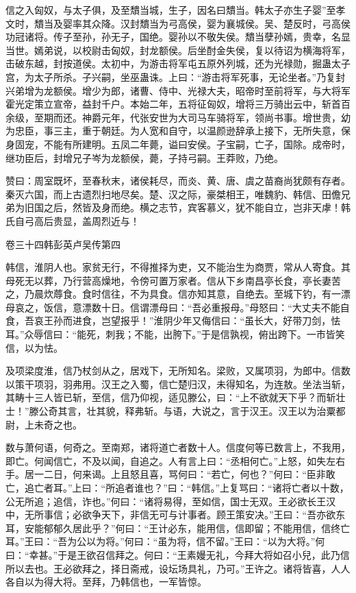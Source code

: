 \documentclass[12pt,UTF8]{ctexbook}
\begin{document}
信之入匈奴，与太子俱，及至穨当城，生子，因名曰穨当。韩太子亦生子婴”至孝文时，穨当及婴率其众降。汉封穨当为弓高侯，婴为襄城侯。吴、楚反时，弓高侯功冠诸将。传子至孙，孙无子，国绝。婴孙以不敬失侯。穨当孽孙嫣，贵幸，名显当世。嫣弟说，以校尉击匈奴，封龙额侯。后坐酎金失侯，复以待诏为横海将军，击破东越，封按道侯。太初中，为游击将军屯五原外列城，还为光禄勋，掘蛊太子宫，为太子所杀。子兴嗣，坐巫蛊诛。上曰：“游击将军死事，无论坐者。”乃复封兴弟增为龙额侯。增少为郎，诸曹、侍中、光禄大夫，昭帝时至前将军，与大将军霍光定策立宣帝，益封千户。本始二年，五将征匈奴，增将三万骑出云中，斩首百余级，至期而还。神爵元年，代张安世为大司马车骑将军，领尚书事。增世贵，幼为忠臣，事三主，重于朝廷。为人宽和自守，以温颜逊辞承上接下，无所失意，保身固宠，不能有所建明。五凤二年薨，谥曰安侯。子宝嗣，亡子，国除。成帝时，继功臣后，封增兄子岑为龙额侯，薨，子持弓嗣。王莽败，乃绝。



赞曰：周室既坏，至春秋末，诸侯耗尽，而炎、黄、唐、虞之苗裔尚犹颇有存者。秦灭六国，而上古遗烈扫地尽矣。楚、汉之际，豪桀相王，唯魏豹、韩信、田儋兄弟为旧国之后，然皆及身而绝。横之志节，宾客慕义，犹不能自立，岂非天虖！韩氏自弓高后贵显，盖周烈近与！





卷三十四韩彭英卢吴传第四



韩信，淮阴人也。家贫无行，不得推择为吏，又不能治生为商贾，常从人寄食。其母死无以葬，乃行营高燥地，令傍可置万家者。信从下乡南昌亭长食，亭长妻苦之，乃晨炊蓐食。食时信往，不为具食。信亦知其意，自绝去。至城下钓，有一漂母哀之，饭信，意漂数十日。信谓漂母曰：“吾必重报母。”母怒曰：“大丈夫不能自食，吾哀王孙而进食，岂望报乎！”淮阴少年又侮信曰：“虽长大，好带刀剑，怯耳。”众辱信曰：“能死，刺我；不能，出胯下。”于是信孰视，俯出跨下。一市皆笑信，以为怯。



及项梁度淮，信乃杖剑从之，居戏下，无所知名。梁败，又属项羽，为郎中。信数以策干项羽，羽弗用。汉王之入蜀，信亡楚归汉，未得知名，为连敖。坐法当斩，其畴十三人皆已斩，至信，信乃仰视，适见滕公，曰：“上不欲就天下乎？而斩壮士！”滕公奇其言，壮其貌，释弗斩。与语，大说之，言于汉王。汉王以为治粟都尉，上未奇之也。



数与萧何语，何奇之。至南郑，诸将道亡者数十人。信度何等已数言上，不我用，即亡。何闻信亡，不及以闻，自追之。人有言上曰：“丞相何亡。”上怒，如失左右手。居一二日，何来谒。上且怒且喜，骂何曰：“若亡，何也？”何曰：“臣非敢亡，追亡者耳。”上曰：“所追者谁也？”曰：“韩信。”上复骂曰：“诸将亡者以十数，公无所追；追信，诈也。”何曰：“诸将易得，至如信，国士无双。王必欲长王汉中，无所事信；必欲争天下，非信无可与计事者。顾王策安决。”王曰：“吾亦欲东耳，安能郁郁久居此乎？”何曰：“王计必东，能用信，信即留；不能用信，信终亡耳。”王曰：“吾为公以为将。”何曰：“虽为将，信不留。”王曰：“以为大将。”何曰：“幸甚。”于是王欲召信拜之。何曰：“王素嫚无礼，今拜大将如召小兒，此乃信所以去也。王必欲拜之，择日斋戒，设坛场具礼，乃可。”王许之。诸将皆喜，人人各自以为得大将。至拜，乃韩信也，一军皆惊。
\end{document}
